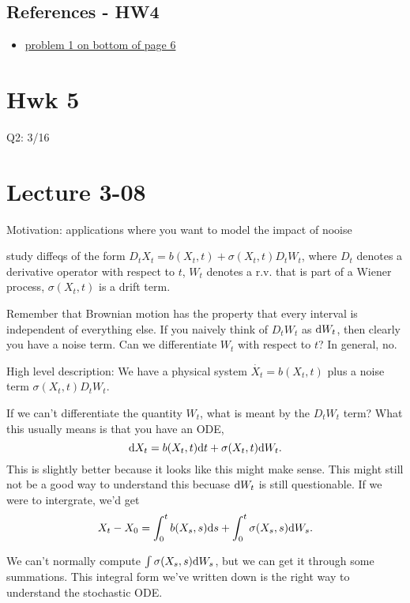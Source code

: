 \subsection{References - HW4}
\begin{itemize}
  \item \href{http://web.math.ku.dk/noter/filer/vidsand12.pdf}{problem 1 on  bottom of page 6}
\end{itemize}



\section{Hwk 5}

Q2: 3/16 



\section{Lecture 3-08}

Motivation: applications where you want to model the impact of nooise 


study diffeqs of the form $D_t X_t = b(X_t, t) + \sigma(X_t, t) D_t W_t$, where $D_t$ denotes a derivative operator with respect to $t$, $W_t$ denotes a r.v. that is part of a Wiener process, $\sigma(X_t, t)$ is a drift term. 

Remember that Brownian motion has the property that every interval  is independent of everything else. If you naively think of $D_t W_t$ as $\text{d} W_t$, then clearly you have a noise term.  Can we differentiate $W_t$ with respect to $t$? In general, no. 

High level description: We have a physical system $\dot{X_t} = b(X_t, t)$ plus a noise term $\sigma(X_t, t) D_t W_t$. 

If we can't differentiate the quantity $W_t$, what is meant by the $D_t W_t$ term? What this usually means is that you have an ODE, 
\[ \text{d} X_t = b(X_t, t)\text{d} t + \sigma(X_t, t) \text{d} W_t. \]
This is slightly better because it looks like this might make sense. This might still not be a good way to understand this becuase $\text{d} W_t$ is still questionable. If we were to intergrate, we'd get 
\[ X_t - X_0 = \int_0^t b(X_s, s)\text{d} s + \int_0^t \sigma(X_s, s) \text{d} W_s. \] 

We can't normally compute $\int \sigma(X_s, s) \text{d} W_s$, but we can get it through some summations. This integral form we've written down is the right way to understand the stochastic ODE. 

